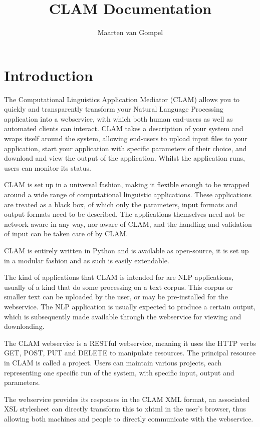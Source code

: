 \documentclass[a4paper,12pt]{report}
\title{CLAM Documentation}
\author{Maarten van Gompel}
\begin{document}
\maketitle
\tableofcontents

\chapter{Introduction} 

The Computational Linguistics Application Mediator (CLAM) allows you to quickly and transparently transform your Natural Language Processing application into a webservice, with which both human end-users as well as automated clients can interact. CLAM takes a description of your system and wraps itself around the system, allowing end-users to upload input files to your application, start your application with specific parameters of their choice, and download and view the output of the application. Whilst the application runs, users can monitor its status.

CLAM is set up in a universal fashion, making it flexible enough to be wrapped around a wide range of computational linguistic applications. These applications are treated as a black box, of which only the parameters, input formats and output formats need to be described. The applications themselves need not be network aware in any way, nor aware of CLAM, and the handling and validation of input can be taken care of by CLAM.

CLAM is entirely written in Python and is available as open-source, it is set up in a modular fashion and as such is easily extendable. 

The kind of applications that CLAM is intended for are NLP applications, usually of a kind that do some processing on a text corpus. This corpus or smaller text can be uploaded by the user, or may be pre-installed for the webservice. The NLP application is usually expected to produce a certain output, which is subsequently made available through the webservice for viewing and downloading.

The CLAM webservice is a RESTful webservice, meaning it uses the HTTP verbs GET, POST, PUT and DELETE to manipulate resources. The principal resource in CLAM is called a project. Users can maintain various projects, each representing one specific run of the system, with specific input, output and parameters.

The webservice provides its responses in the CLAM XML format, an associated XSL stylesheet can directly transform this to xhtml in the user's browser, thus allowing both machines and people to directly communicate with the webservice.
\end{document}
